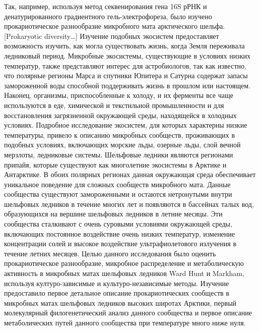 Так, например, используя метод секвенирования гена 16S рРНК и денатурированного градиентного гель-электрофореза, было изучено прокариотическое разнообразие микробного мата арктического шельфа. [Prokaryotic diversity…] Изучение подобных экосистем предоставляет возможность изучить, как могла существовать жизнь, когда Земля переживала ледниковый период. Микробные экосистемы, существующие в условиях низких температур, также представляют интерес для астробиологов, так как известно, что полярные регионы Марса и спутники Юпитера и Сатурна содержат запасы замороженной воды способной поддерживать жизнь в прошлом или настоящем. Наконец, организмы, приспособленные к холоду,  и их ферменты все чаще используются в еде, химической и текстильной промышленности и для восстановления загрязненной окружающей среды, находящейся в холодных условиях. Подробное исследование экосистем, для которых характерны низкие температуры, привело к описанию микробных сообществ, проживающих в подобных условиях, включающих морские льды, озерные льды, слой вечной мерзлоты, ледниковые системы. Шельфовые ледники являются регионами припайя, которые существуют как многолетние экосистемы в Арктике и Антарктике. В обоих полярных регионах данная окружающая среда обеспечивает уникальное поведение для сложных сообществ микробного мата. Данные сообщества существуют замороженными и остаются нетронутыми внутри шельфовых ледников в течение многих лет и появляются в бассейнах талых вод, образующихся на вершине  шельфовых ледников в летние месяцы. Эти сообщества сталкивают с очень суровыми условиями окружающей среды, включающих постоянное воздействие очень низких температур, изменение концентрации солей и высокое воздействие ультрафиолетового излучения в течение летних месяцев. Целью данного исследования было оценить прокариотическое разнообразие, микробное распределение и метаболическую активность в микробных матах шельфовых ледников Ward Hunt и Markham, используя културо-зависимые и культуро-независимые методы. Изучение предоставило первое детальное описание прокариотических сообществ в микробных матах шельфовых ледников высоких широтах Арктики, первый молекулярный филогенетический анализ данного сообщества и первое описание метаболических путей данного сообщества при температуре много ниже нуля. 

